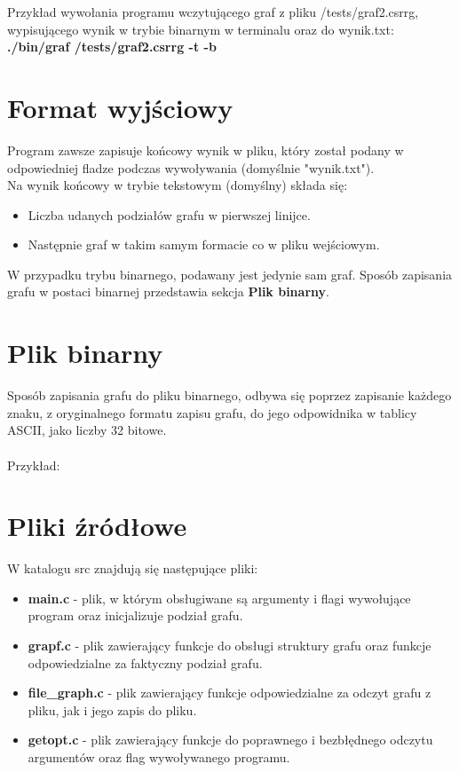 \documentclass{article}
\begin{document}
Przykład wywołania programu wczytującego graf z pliku /tests/graf2.csrrg, wypisującego wynik w trybie binarnym w terminalu oraz do wynik.txt:\\
\textbf{./bin/graf /tests/graf2.csrrg -t -b}

\section*{Format wyjściowy}
Program zawsze zapisuje końcowy wynik w pliku, który został podany w odpowiedniej fladze podczas wywoływania (domyślnie "wynik.txt").\\

Na wynik końcowy w trybie tekstowym (domyślny) składa się:
\begin{itemize}
    \item Liczba udanych podziałów grafu w pierwszej linijce.

    \item Następnie graf w takim samym formacie co w pliku wejściowym.
\end{itemize}

W przypadku trybu binarnego, podawany jest jedynie sam graf. Sposób zapisania grafu w postaci binarnej przedstawia sekcja \textbf{Plik binarny}.

\section*{Plik binarny}
Sposób zapisania grafu do pliku binarnego, odbywa się poprzez zapisanie każdego znaku, z oryginalnego formatu zapisu grafu, do jego odpowidnika w tablicy ASCII, jako liczby 32 bitowe.\\\\

Przykład:\\


\section*{Pliki źródłowe}
W katalogu src znajdują się następujące pliki:
\begin{itemize}
    \item \textbf{main.c} - plik, w którym obsługiwane są argumenty i flagi wywołujące program oraz inicjalizuje podział grafu.

    \item \textbf{grapf.c} - plik zawierający funkcje do obsługi struktury grafu oraz funkcje odpowiedzialne za faktyczny podział grafu.

    \item \textbf{file\_graph.c} - plik zawierający funkcje odpowiedzialne za odczyt grafu z pliku, jak i jego zapis do pliku.

    \item \textbf{getopt.c} - plik zawierający funkcje do poprawnego i bezbłędnego odczytu argumentów oraz flag wywoływanego programu.
    
\end{itemize}
\end{document}
